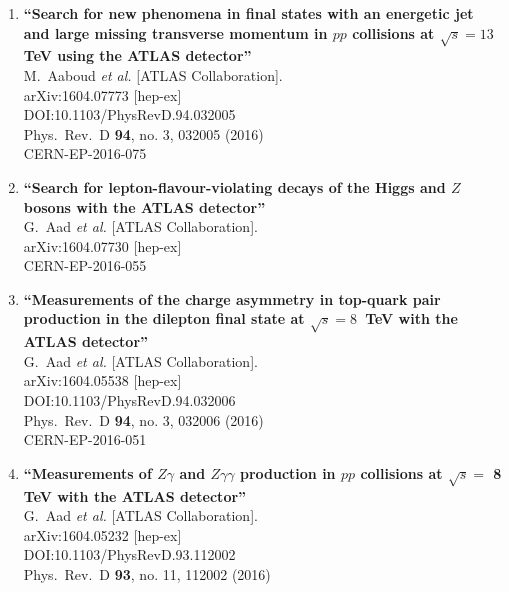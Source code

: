 \documentclass{article}
\begin{document}
\begin{enumerate}
\item%
{\bf ``Search for new phenomena in final states with an energetic jet and large missing transverse momentum in $pp$ collisions at $\sqrt{s}=13$  TeV using the ATLAS detector''}
  \\{}M.~Aaboud {\it et al.} [ATLAS Collaboration].
  \\{}arXiv:1604.07773 [hep-ex]
  \\{}DOI:10.1103/PhysRevD.94.032005
  \\{}Phys.\ Rev.\ D {\bf 94}, no. 3, 032005 (2016)
  \\{}CERN-EP-2016-075
\item%
{\bf ``Search for lepton-flavour-violating decays of the Higgs and $Z$ bosons with the ATLAS detector''}
  \\{}G.~Aad {\it et al.} [ATLAS Collaboration].
  \\{}arXiv:1604.07730 [hep-ex]
  \\{}CERN-EP-2016-055
\item%
{\bf ``Measurements of the charge asymmetry in top-quark pair production in the dilepton final state at $\sqrt{s}=8$  TeV with the ATLAS detector''}
  \\{}G.~Aad {\it et al.} [ATLAS Collaboration].
  \\{}arXiv:1604.05538 [hep-ex]
  \\{}DOI:10.1103/PhysRevD.94.032006
  \\{}Phys.\ Rev.\ D {\bf 94}, no. 3, 032006 (2016)
  \\{}CERN-EP-2016-051
\item%
{\bf ``Measurements of $Z\gamma$ and $Z\gamma\gamma$ production in $pp$ collisions at $\sqrt{s}=$ 8 TeV with the ATLAS detector''}
  \\{}G.~Aad {\it et al.} [ATLAS Collaboration].
  \\{}arXiv:1604.05232 [hep-ex]
  \\{}DOI:10.1103/PhysRevD.93.112002
  \\{}Phys.\ Rev.\ D {\bf 93}, no. 11, 112002 (2016)

\end{enumerate}
\end{document}
